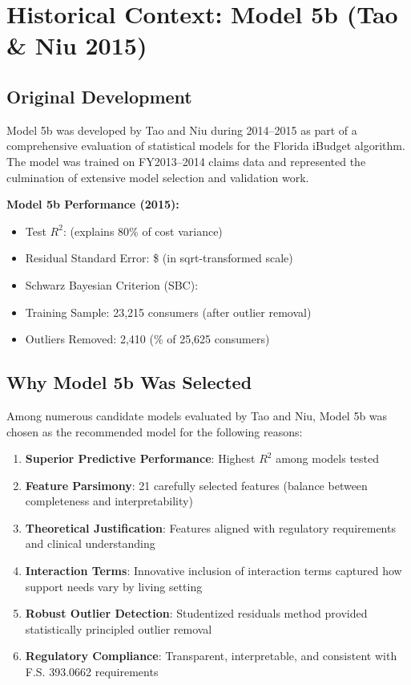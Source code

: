 \section{Historical Context: Model 5b (Tao \& Niu 2015)}

\subsection{Original Development}

Model 5b was developed by Tao and Niu during 2014--2015 as part of a comprehensive evaluation of statistical models for the Florida iBudget algorithm. The model was trained on FY2013--2014 claims data and represented the culmination of extensive model selection and validation work.

\textbf{Model 5b Performance (2015):}
\begin{itemize}
    \item Test $R^2$: \ModelOneFiveBRSquaredTwoThousandFifteen{} (explains 80\% of cost variance)
    \item Residual Standard Error: \$\ModelOneFiveBRMSETwoThousandFifteen{} (in sqrt-transformed scale)
    \item Schwarz Bayesian Criterion (SBC): \ModelOneFiveBSBCTwoThousandFifteen
    \item Training Sample: 23,215 consumers (after outlier removal)
    \item Outliers Removed: 2,410 (\ModelOneFiveBOutlierPctTwoThousandFifteen\% of 25,625 consumers)
\end{itemize}

\subsection{Why Model 5b Was Selected}

Among numerous candidate models evaluated by Tao and Niu, Model 5b was chosen as the recommended model for the following reasons:

\begin{enumerate}
    \item \textbf{Superior Predictive Performance}: Highest $R^2$ among models tested
    \item \textbf{Feature Parsimony}: 21 carefully selected features (balance between completeness and interpretability)
    \item \textbf{Theoretical Justification}: Features aligned with regulatory requirements and clinical understanding
    \item \textbf{Interaction Terms}: Innovative inclusion of interaction terms captured how support needs vary by living setting
    \item \textbf{Robust Outlier Detection}: Studentized residuals method provided statistically principled outlier removal
    \item \textbf{Regulatory Compliance}: Transparent, interpretable, and consistent with F.S. 393.0662 requirements
\end{enumerate}

